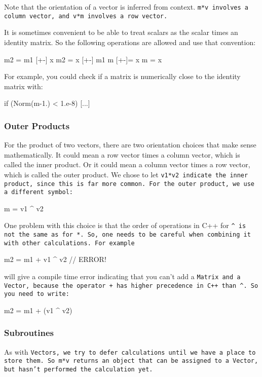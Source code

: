 Note that the orientation of a vector is inferred from context.  \tt{m*v} involves a 
column vector, and \tt{v*m} involves a row vector.

It is sometimes convenient to be able to treat scalars as the scalar times an
identity matrix.  So the following operations are allowed and use that convention:
\begin{tmvcode}
m2 = m1 [+-] x
m2 = x [+-] m1
m [+-]= x
m = x
\end{tmvcode}
For example, you could check if a matrix is numerically close to the identity matrix 
with:
\begin{tmvcode}
if (Norm(m-1.) < 1.e-8) { [...] }
\end{tmvcode}

\subsubsection{Outer Products}

For the product of two vectors, there are two orientation choices that make sense mathematically.
It could mean a row vector times a column vector, which is called the inner product.
Or it could mean a column vector times a row vector, which is called the outer product.
We chose to let \tt{v1*v2} indicate the inner product, since this is far more common.
For the outer product, we use a different symbol:
\begin{tmvcode}
m = v1 ^ v2
\end{tmvcode}
One problem with this choice is that the order of operations in C++ for \tt{\^} 
is not the same as for \tt{*}.  
So, one needs to be careful when combining it with other calculations.
For example
\begin{tmvcode}
m2 = m1 + v1 ^ v2   // ERROR!
\end{tmvcode}
will give a compile time error indicating that you can't add a 
\tt{Matrix} and a \tt{Vector}, 
because the operator \tt{+} has higher precedence in C++ than \tt{\^}.
So you need to write:
\begin{tmvcode}
m2 = m1 + (v1 ^ v2)
\end{tmvcode}

\subsubsection{Subroutines}

As with \tt{Vector}s, we try to defer calculations until we have a place to store them.
So \tt{m*v} returns an object that can be assigned to a \tt{Vector},
but hasn't performed the calculation yet.  

